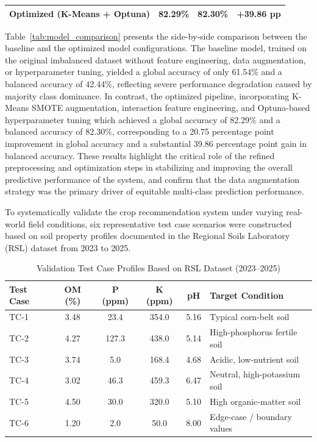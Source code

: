 {\begin{table}[H]
\begin{tabularx}{\textwidth}{p{5cm} X X X}
			\addlinespace[6pt]
			
			Optimized (K-Means + Optuna) &
			82.29\% &
			82.30\% &
			+39.86 pp \\
			
			\bottomrule
		\end{tabularx}
		
	\end{table}
	
	Table~\ref{tab:model_comparison} presents the side-by-side comparison between the baseline and the optimized model configurations. The baseline model, trained on the original imbalanced dataset without feature engineering, data augmentation, or hyperparameter tuning, yielded a global accuracy of only 61.54\% and a balanced accuracy of 42.44\%, reflecting severe performance degradation caused by majority class dominance. In contrast, the optimized pipeline, incorporating K-Means SMOTE augmentation, interaction feature engineering, and Optuna-based hyperparameter tuning which achieved a global accuracy of 82.29\% and a balanced accuracy of 82.30\%, corresponding to a 20.75 percentage point improvement in global accuracy and a substantial 39.86 percentage point gain in balanced accuracy. These results highlight the critical role of the refined preprocessing and optimization steps in stabilizing and improving the overall predictive performance of the system, and confirm that the data augmentation strategy was the primary driver of equitable multi-class prediction performance.
	
	To systematically validate the crop recommendation system under varying real-world field conditions, six representative test case scenarios were constructed based on soil property profiles documented in the Regional Soils Laboratory (RSL) dataset from 2023 to 2025.
	
	\begin{table}[H]
		\centering
		\caption{Validation Test Case Profiles Based on RSL Dataset (2023--2025)}
		\label{tab:validation_test_cases}
		
		\small
		\renewcommand{\arraystretch}{1.2}
		
		\begin{tabularx}{\textwidth}{l c c c c X}
			\toprule
			\textbf{Test Case} & \textbf{OM (\%)} & \textbf{P (ppm)} & \textbf{K (ppm)} & \textbf{pH} & \textbf{Target Condition} \\
			\midrule
			TC-1 & 3.48 & 23.4 & 354.0 & 5.16 & Typical corn-belt soil \\
			TC-2 & 4.27 & 127.3 & 438.0 & 5.14 & High-phosphorus fertile soil \\
			TC-3 & 3.74 & 5.0 & 168.4 & 4.68 & Acidic, low-nutrient soil \\
			TC-4 & 3.02 & 46.3 & 459.3 & 6.47 & Neutral, high-potassium soil \\
			TC-5 & 4.50 & 30.0 & 320.0 & 5.10 & High organic-matter soil \\
			TC-6 & 1.20 & 2.0 & 50.0 & 8.00 & Edge-case / boundary values \\
			\bottomrule
		\end{tabularx}
	\end{table}
	
}
